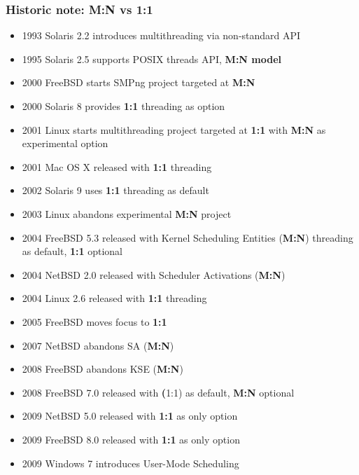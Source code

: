 \documentclass{beamer}
\begin{document}
\begin{frame}
\frametitle{Historic note: M:N vs 1:1}
 {
  \begin{itemize}
    \item{1993 Solaris 2.2 introduces multithreading via non-standard API}
    \item{1995 Solaris 2.5 supports POSIX threads API, \textbf{M:N model}}
    \item{2000 FreeBSD starts SMPng project targeted at \textbf{M:N}}
    \item{2000 Solaris 8 provides \textbf{1:1} threading as option}
    \item{2001 Linux starts multithreading project targeted at \textbf{1:1}
  	with \textbf{M:N} as experimental option}
    \item{2001 Mac OS X released with \textbf{1:1} threading}
    \item{2002 Solaris 9 uses \textbf{1:1} threading as default}
    \item{2003 Linux abandons experimental \textbf{M:N} project}
    \item{2004 FreeBSD 5.3 released with Kernel Scheduling Entities
  	(\textbf{M:N}) threading as default, \textbf{1:1} optional}
    \item{2004 NetBSD 2.0 released with Scheduler Activations (\textbf{M:N})}
    \item{2004 Linux 2.6 released with \textbf{1:1} threading}
  \end{itemize}
}
 {
  \begin{itemize}
    \item{2005 FreeBSD moves focus to \textbf{1:1}}
    \item{2007 NetBSD abandons SA (\textbf{M:N})}
    \item{2008 FreeBSD abandons KSE (\textbf{M:N})}
    \item{2008 FreeBSD 7.0 released with \textbf(1:1) as default,
  	\textbf{M:N} optional}
    \item{2009 NetBSD 5.0 released with \textbf{1:1} as only option}
    \item{2009 FreeBSD 8.0 released with \textbf{1:1} as only option}
    \item{2009 Windows 7 introduces User-Mode Scheduling}
  \end{itemize}
}
\end{frame}
\end{document}

